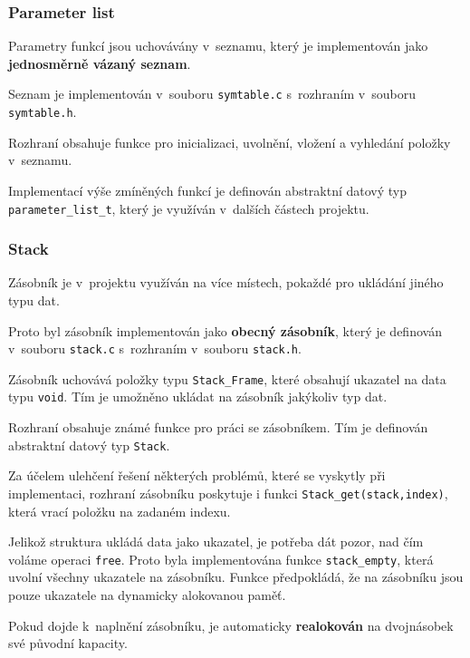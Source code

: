 \documentclass[a4paper, 11pt]{article}
\begin{document}
	\subsubsection{Parameter list}
	Parametry funkcí jsou uchovávány v~seznamu, který je implementován jako \textbf{jednosměrně vázaný seznam}.
	\par\noindent Seznam je implementován v~souboru \texttt{symtable.c} s~rozhraním v~souboru \texttt{symtable.h}.
	\par\noindent Rozhraní obsahuje funkce pro inicializaci, uvolnění, vložení a vyhledání položky v~seznamu.
	\par\noindent Implementací výše zmíněných funkcí je definován abstraktní datový typ \texttt{parameter\_list\_t}, který je vy\-užíván v~dalších částech projektu.


	\subsubsection{Stack}
	Zásobník je v~projektu využíván na více místech, pokaždé pro ukládání jiného typu dat.
	\par\noindent Proto byl zásobník implementován jako \textbf{obecný zásobník}, který je definován v~souboru \texttt{stack.c} s~rozhraním v~souboru \texttt{stack.h}.
	\par\noindent Zásobník uchovává položky typu \texttt{Stack\_Frame}, které obsahují ukazatel na data typu \texttt{void}. Tím je umožněno ukládat na zásobník jakýkoliv typ dat.
	\par\noindent Rozhraní obsahuje známé funkce pro práci se zásobníkem. Tím je definován abstraktní datový typ \texttt{Stack}.
	\par\noindent Za účelem ulehčení řešení některých problémů, které se vyskytly při implementaci, rozhraní zásobníku poskytuje i funkci \texttt{Stack\_get(stack,index)}, která vrací položku na zadaném indexu.
	\par\noindent Jelikož struktura ukládá data jako ukazatel, je potřeba dát pozor, nad čím voláme operaci \texttt{free}. Proto byla implementována funkce \texttt{stack\_empty}, která uvolní všechny ukazatele na zásobníku. Funkce předpokládá, že na zásobníku jsou pouze ukazatele na dynamicky alokovanou paměť.
	\par\noindent Pokud dojde k~naplnění zásobníku, je automaticky \textbf{realokován} na dvojnásobek své původní kapacity.
\end{document}
